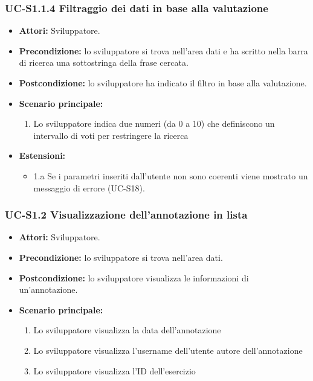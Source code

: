 	\subsubsection{UC-S1.1.4 Filtraggio dei dati in base alla valutazione}	
		\begin{itemize}
			\item \textbf{Attori:} Sviluppatore.
			\item \textbf{Precondizione:} lo sviluppatore si trova nell'area dati e ha scritto nella barra di ricerca una sottostringa della frase cercata.
			\item \textbf{Postcondizione:} lo sviluppatore ha indicato il filtro in base alla valutazione.
			\item \textbf{Scenario principale:}
				\begin{enumerate}
					\item Lo sviluppatore indica due numeri (da 0 a 10) che definiscono un intervallo di voti per restringere la ricerca
				\end{enumerate}
			\item \textbf{Estensioni:}
				\begin{itemize}
					\item 1.a Se i parametri inseriti dall'utente non sono coerenti viene mostrato un messaggio di errore (UC-S18).
				\end{itemize}
		\end{itemize}	
		
	\subsubsection{UC-S1.2 Visualizzazione dell'annotazione in lista}
		\begin{itemize}
			\item \textbf{Attori:} Sviluppatore.
			\item \textbf{Precondizione:} lo sviluppatore si trova nell'area dati.
			\item \textbf{Postcondizione:} lo sviluppatore visualizza le informazioni di un'annotazione.
			\item \textbf{Scenario principale:}
				\begin{enumerate}
					\item Lo sviluppatore visualizza la data dell'annotazione
					\item Lo sviluppatore visualizza l'username dell'utente autore dell'annotazione
					\item Lo sviluppatore visualizza l'ID dell'esercizio
				\end{enumerate}
		\end{itemize}

